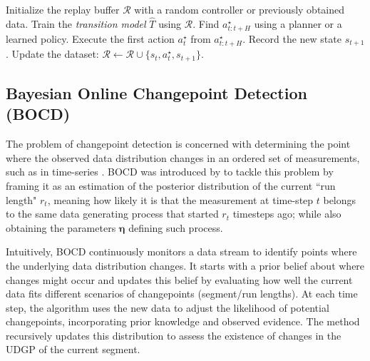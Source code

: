 \documentclass[Afour,sageh,times]{sagej}
\theoremstyle{lemma}
\begin{document}
\begin{algorithm}
\caption{MBRL Framework Overview}\label{alg:mbrl}
\begin{algorithmic}[1]
\State Initialize the replay buffer $\mathcal{R}$ with a random controller or previously obtained data.
    \State Train the \textit{transition model} $\hat{T}$ using $\mathcal{R}$. 
        \State Find ${a}^\star_{t:t+H}$ using a planner or a learned policy.
        \State Execute the first action ${a}^\star_t$ from ${a}^\star_{t:t+H}$.
        \State Record the new state ${s}_{t+1}$.
        \State Update the dataset: $\mathcal{R} \leftarrow \mathcal{R} \cup \{{s}_t, {a}^\star_t, {s}_{t+1}\}$.
    \EndFor
\EndFor
\end{algorithmic}
\end{algorithm}

\subsection{Bayesian Online Changepoint Detection (BOCD)} \label{sec:prelim-bocd}

The problem of changepoint detection is concerned with determining the point where the observed data distribution changes in an ordered set of measurements, such as in time-series \cite[]{fearnhead2019changepoint}. BOCD was introduced by \citet{adams2007bayesian} to tackle this problem by framing it as an estimation of the posterior distribution of the current ``run length" $r_t$, meaning how likely it is that the measurement at time-step $t$ belongs to the same data generating process that started $r_t$ timesteps ago; while also obtaining the parameters $\boldsymbol{\eta}$ defining such process.

Intuitively, BOCD continuously monitors a data stream to identify points where the underlying data distribution changes. It starts with a prior belief about where changes might occur and updates this belief by evaluating how well the current data fits different scenarios of changepoints (segment/run lengths). At each time step, the algorithm uses the new data to adjust the likelihood of potential changepoints, incorporating prior knowledge and observed evidence. The method recursively updates this distribution to assess the existence of changes in the UDGP of the current segment.
\end{document}
